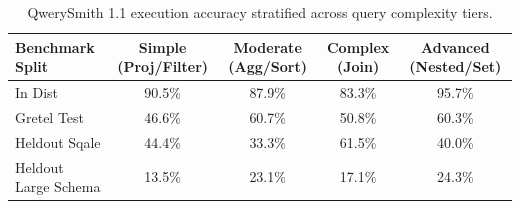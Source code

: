 \begin{table}[t]
\centering\small
\begin{tabular}{lcccc}
\toprule
\textbf{Benchmark Split} & \textbf{Simple (Proj/Filter)} & \textbf{Moderate (Agg/Sort)} & \textbf{Complex (Join)} & \textbf{Advanced (Nested/Set)} \\
\midrule
In Dist & 90.5\% & 87.9\% & 83.3\% & 95.7\% \\
Gretel Test & 46.6\% & 60.7\% & 50.8\% & 60.3\% \\
Heldout Sqale & 44.4\% & 33.3\% & 61.5\% & 40.0\% \\
Heldout Large Schema & 13.5\% & 23.1\% & 17.1\% & 24.3\% \\
\bottomrule
\end{tabular}
\caption{QwerySmith 1.1 execution accuracy stratified across query complexity tiers.}
\label{tab:complexity_matrix}
\end{table}
